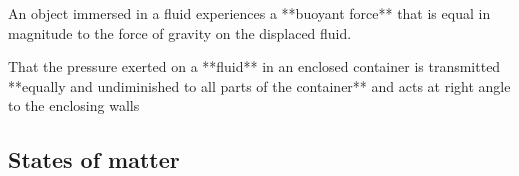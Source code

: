 An object immersed in a fluid experiences a **buoyant force** that is equal in magnitude to the force of gravity on the displaced fluid.

That the pressure exerted on a **fluid** in an enclosed container is transmitted **equally and undiminished to all parts of the container** and acts at right angle to the enclosing walls


\subsection{States of matter}